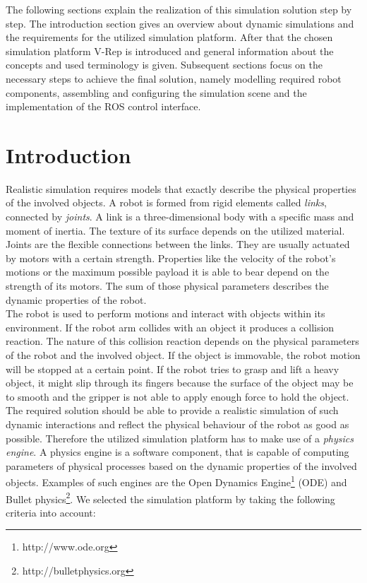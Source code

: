 The following sections explain the realization of this simulation solution step by step. The introduction section gives an overview about dynamic simulations and the requirements for the utilized simulation platform. After that the chosen simulation platform V-Rep is introduced and general information about the concepts and used terminology is given. Subsequent sections focus on the necessary steps to achieve the final solution, namely modelling required robot components, assembling and configuring the simulation scene and the implementation of the ROS control interface.

\section{Introduction}

Realistic simulation requires models that exactly describe the physical properties of the involved objects. A robot is formed from rigid elements called \emph{links}, connected by \emph{joints}. A link is a three-dimensional body with a specific mass and moment of inertia. The texture of its surface depends on the utilized material. Joints are the flexible connections between the links. They are usually actuated by motors with a certain strength. Properties like the velocity of the robot's motions or the maximum possible payload it is able to bear depend on the strength of its motors. The sum of those physical parameters describes the dynamic properties of the robot. \\

The robot is used to perform motions and interact with objects within its environment. If the robot arm collides with an object it produces a collision reaction. The nature of this collision reaction depends on the physical parameters of the robot and the involved object. If the object is immovable, the robot motion will be stopped at a certain point. If the robot tries to grasp and lift a heavy object, it might slip through its fingers because the surface of the object may be to smooth and the gripper is not able to apply enough force to hold the object. \\

The required solution should be able to provide a realistic simulation of such dynamic interactions and reflect the physical behaviour of the robot as good as possible. Therefore the utilized simulation platform has to make use of a \emph{physics engine}. A physics engine is a software component, that is capable of computing parameters of physical processes based on the dynamic properties of the involved objects. Examples of such engines are the Open Dynamics Engine\footnote{http://www.ode.org} (ODE) and Bullet physics\footnote{http://bulletphysics.org}. We selected the simulation platform by taking the following criteria into account:

